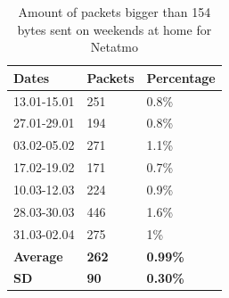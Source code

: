 \begin{table}[H]
    \centering
    \caption{Amount of packets bigger than 154 bytes sent on weekends at home for Netatmo}
    \begin{tabular}{|l|l|l|}
        \hline
        \textbf{Dates}   & \textbf{Packets} & \textbf{Percentage} \\ \hline
        13.01-15.01      & 251              & 0.8\%               \\ \hline
        27.01-29.01      & 194              & 0.8\%               \\ \hline
        03.02-05.02      & 271              & 1.1\%               \\ \hline
        17.02-19.02      & 171              & 0.7\%               \\ \hline
        10.03-12.03      & 224              & 0.9\%               \\ \hline
        28.03-30.03      & 446              & 1.6\%               \\ \hline
        31.03-02.04      & 275              & 1\%                 \\ \hline
        \textbf{Average} & \textbf{262}     & \textbf{0.99\%}     \\ \hline
        \textbf{\gls{SD}} & \textbf{90}      & \textbf{0.30\%}     \\ \hline
    \end{tabular}
    \label{tab:NetatmoBigPackets}
\end{table}

